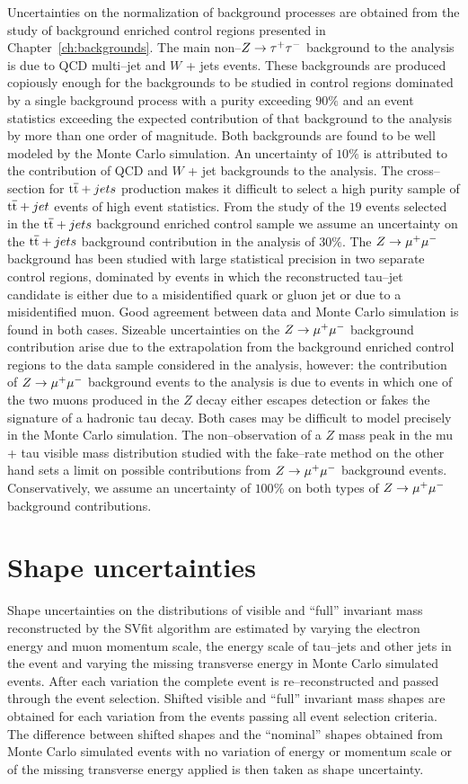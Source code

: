Uncertainties on the normalization of background processes are obtained from the
study of background enriched control regions presented in
Chapter~\ref{ch:backgrounds}.  The main non--$Z \to \tau^+\tau^-$ background to
the analysis is due to QCD multi--jet and $W$ + jets events.  These backgrounds
are produced copiously enough for the backgrounds to be studied in control
regions dominated by a single background process with a purity exceeding $90\%$
and an event statistics exceeding the expected contribution of that background
to the analysis by more than one order of magnitude.  Both backgrounds are found
to be well modeled by the Monte Carlo simulation.  An uncertainty of $10\%$ is
attributed to the contribution of QCD and $W$ + jet backgrounds to the analysis.
The cross--section for $\mathrm{t}\overline{\mathrm{t}} + jets$ production makes it difficult to select a
high purity sample of $\mathrm{t}\overline{\mathrm{t}} + jet$ events of high event statistics.  From the
study of the $19$ events selected in the $\mathrm{t}\overline{\mathrm{t}} + jets$ background enriched
control sample we assume an uncertainty on the $\mathrm{t}\overline{\mathrm{t}} + jets$ background
contribution in the analysis of $30\%$.  The $Z \to \mu^+\mu^-$ background has been
studied with large statistical precision in two separate control regions,
dominated by events in which the reconstructed tau--jet candidate is either due
to a misidentified quark or gluon jet or due to a misidentified muon.  Good
agreement between data and Monte Carlo simulation is found in both cases.
Sizeable uncertainties on the $Z \to \mu^+\mu^-$ background contribution arise due to
the extrapolation from the background enriched control regions to the data
sample considered in the analysis, however: the contribution of $Z \to \mu^+\mu^-$
background events to the analysis is due to events in which one of the two muons
produced in the $Z$ decay either escapes detection or fakes the signature of a
hadronic tau decay.  Both cases may be difficult to model precisely in the Monte
Carlo simulation.  The non--observation of a $Z$ mass peak in the mu + tau
visible mass distribution studied with the fake--rate method on the other hand
sets a limit on possible contributions from $Z \to \mu^+\mu^-$ background events.
Conservatively, we assume an uncertainty of $100\%$ on both types of $Z \to \mu^+\mu^-$
background contributions.


\section{Shape uncertainties}

Shape uncertainties on the distributions of visible and ``full'' invariant mass
reconstructed by the SVfit algorithm are estimated by varying the electron
energy and muon momentum scale, the energy scale of tau--jets and other jets in
the event and varying the missing transverse energy in Monte Carlo simulated
events.  After each variation the complete event is re--reconstructed and passed
through the event selection.  Shifted visible and ``full'' invariant mass shapes
are obtained for each variation from the events passing all event selection
criteria.  The difference between shifted shapes and the ``nominal'' shapes
obtained from Monte Carlo simulated events with no variation of energy or
momentum scale or of the missing transverse energy applied is then taken as
shape uncertainty.

